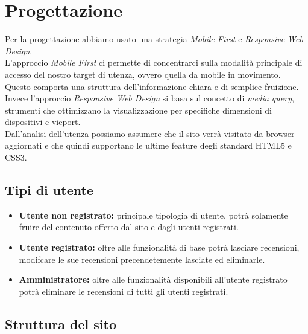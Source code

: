 \section{Progettazione}

Per la progettazione abbiamo usato una strategia \textit{Mobile First} e \textit{Responsive Web Design}.\\
L'approccio \textit{Mobile First} ci permette di concentrarci sulla modalità principale di accesso del nostro target di utenza, ovvero quella da mobile in movimento. Questo comporta una struttura dell'informazione chiara e di semplice fruizione.\\
Invece l'approccio \textit{Responsive Web Design} si basa sul concetto di \textit{media query}, strumenti che ottimizzano la visualizzazione per specifiche dimensioni di dispositivi e vieport.\\
Dall'analisi dell'utenza possiamo assumere che il sito verrà visitato da browser aggiornati e che quindi supportano le ultime feature degli standard HTML5 e CSS3.\\

\subsection{Tipi di utente}

\begin{itemize}
    \item \textbf{Utente non registrato:} principale tipologia di utente, potrà solamente fruire del contenuto offerto dal sito e dagli utenti registrati.
    \item \textbf{Utente registrato:} oltre alle funzionalità di base potrà lasciare recensioni, modifcare le sue recensioni precendetemente lasciate ed eliminarle.
    \item \textbf{Amministratore:} oltre alle funzionalità disponibili all'utente registrato potrà eliminare le recensioni di tutti gli utenti registrati.
\end{itemize}

\subsection{Struttura del sito}

